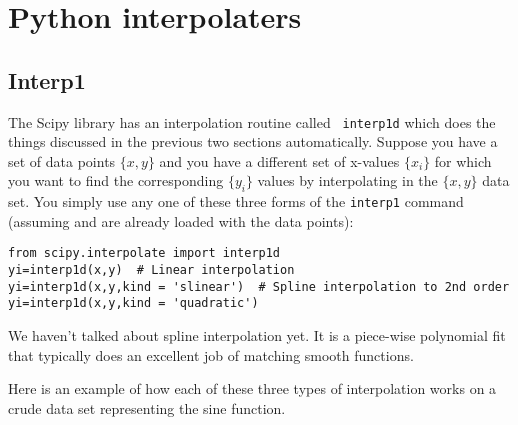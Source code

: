 \section{Python interpolaters}

\subsection*{Interp1}
 The Scipy library has an interpolation routine called {\tt
interp1d} which does the things discussed in the previous two sections
automatically. Suppose you have a set of data points $\{x,y\}$ and
you have a different set of x-values $\{x_i\}$ for which you want to
find the corresponding $\{y_i\}$ values by interpolating in the
$\{x,y\}$ data set. You simply use any one of these three forms of
the {\tt interp1} command (assuming  and  are already
loaded with the data points):
\begin{Verbatim}
from scipy.interpolate import interp1d
yi=interp1d(x,y)  # Linear interpolation
yi=interp1d(x,y,kind = 'slinear')  # Spline interpolation to 2nd order
yi=interp1d(x,y,kind = 'quadratic')
\end{Verbatim}
We haven't talked about spline interpolation yet.  It is a
piece-wise polynomial fit that typically does an excellent job of
matching smooth functions.

Here is an example of how each of these three types of interpolation
works on a crude data set representing the sine function.

